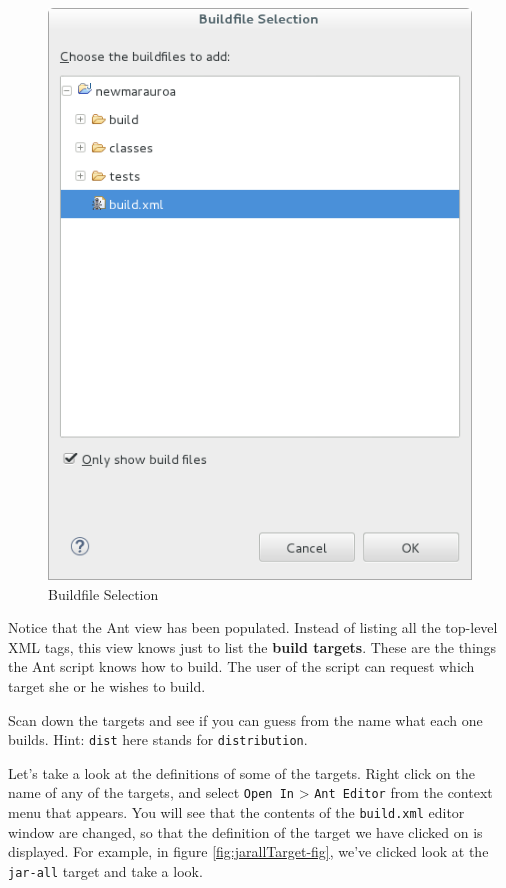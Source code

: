 \documentclass[
]{book}
\begin{document}
\begin{figure}

{\centering \includegraphics[width=1\linewidth]{images/2.1selectBuildfile} 

}

\caption{Buildfile Selection}\label{fig:selectBuildfile-fig}
\end{figure}

Notice that the Ant view has been populated. Instead of listing all the top-level XML tags, this view knows just to list the \textbf{build targets}. These are the things the Ant script knows how to build. The user of the script can request which target she or he wishes to build.

Scan down the targets and see if you can guess from the name what each one builds. Hint: \texttt{dist} here stands for \texttt{distribution}.

Let's take a look at the definitions of some of the targets. Right click on the name of any of the targets, and select \texttt{Open\ In} \textgreater{} \texttt{Ant\ Editor} from the context menu that appears. You will see that the contents of the \texttt{build.xml} editor window are changed, so that the definition of the target we have clicked on is displayed. For example, in figure \ref{fig:jarallTarget-fig}, we've clicked look at the \texttt{jar-all} target and take a look.
\end{document}
